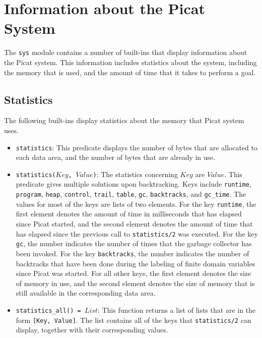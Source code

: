 \section{Information about the Picat System}
The \texttt{sys} module contains a number of built-ins that display information about the Picat system.  This information includes statistics about the system, including the memory that is used, and the amount of time that it takes to perform a goal.

\subsection{Statistics}
The following built-ins display statistics about the memory that Picat system uses.
\begin{itemize}
\item \texttt{statistics}: This predicate displays the number of bytes that are allocated to each data area, and the number of bytes that are already in use.
\item \texttt{statistics($Key$, $Value$)}: The statistics concerning $Key$ are $Value$.  This predicate gives multiple solutions upon backtracking.  Keys include \texttt{runtime}, \texttt{program}, \texttt{heap}, \texttt{control}, \texttt{trail}, \texttt{table}, \texttt{gc}, \texttt{backtracks}, and \texttt{gc\_time}.  The values for most of the keys are lists of two elements.  For the key \texttt{runtime}, the first element denotes the amount of time in milliseconds that has elapsed since Picat started, and the second element denotes the amount of time that has elapsed since the previous call to \texttt{statistics/2} was executed.  For the key \texttt{gc}, the number indicates the number of times that the garbage collector has been invoked.  For the key \texttt{backtracks}, the number indicates the number of backtracks that have been done during the labeling of finite domain variables since Picat was started.  For all other keys, the first element denotes the size of memory in use, and the second element denotes the size of memory that is still available in the corresponding data area.
\item \texttt{statistics\_all() = $List$}: This function returns a list of lists that are in the form \texttt{[Key, Value]}.  The list contains all of the keys that \texttt{statistics/2} can display, together with their corresponding values.
\end{itemize} 


